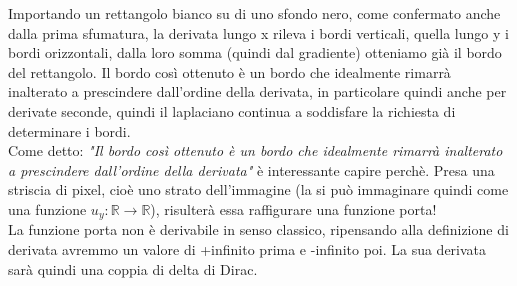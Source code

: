 Importando un rettangolo bianco su di uno sfondo nero, come confermato anche dalla prima sfumatura, la derivata lungo x rileva i bordi verticali, quella lungo y i bordi orizzontali, dalla loro somma (quindi dal gradiente) otteniamo già il bordo del rettangolo.
Il bordo così ottenuto è un bordo che idealmente rimarrà inalterato a prescindere dall'ordine della derivata, in particolare quindi anche per derivate seconde, quindi il laplaciano continua a soddisfare la richiesta di determinare i bordi. \\
Come detto: \textit{"Il bordo così ottenuto è un bordo che idealmente rimarrà inalterato a prescindere dall'ordine della derivata"} è interessante capire perchè. Presa una striscia di pixel, cioè uno strato dell'immagine (la si può immaginare quindi come una funzione $u_y:\mathbb{R} \longrightarrow \mathbb{R}$), risulterà essa raffigurare una funzione porta!\\
La funzione porta non è derivabile in senso classico, ripensando alla definizione di derivata avremmo un valore di +infinito prima e -infinito poi. La sua derivata sarà quindi una coppia di delta di Dirac.\\

